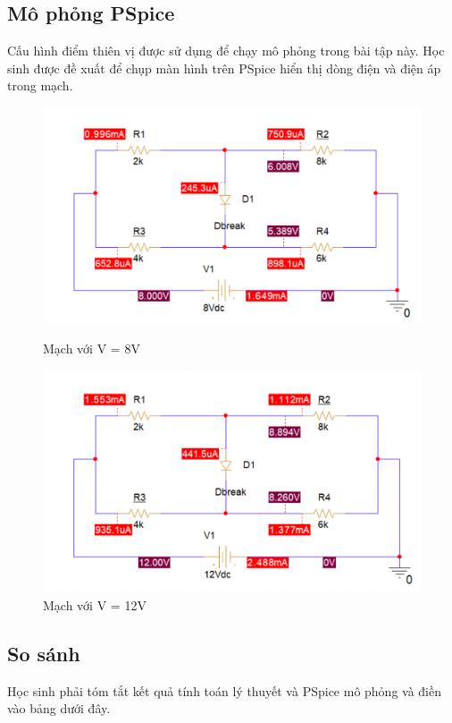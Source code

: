 \subsection{Mô phỏng PSpice}
Cấu hình điểm thiên vị được sử dụng để chạy mô phỏng trong bài tập này. Học sinh được đề xuất
để chụp màn hình trên PSpice hiển thị dòng điện và điện áp trong mạch.
\begin{figure}[h]
    \centering
    \includegraphics[scale=0.27]{graphics/ex3/f2.png}
    \caption{Mạch với V = 8V}
    \includegraphics[scale=0.27]{graphics/ex3/f4.png}
    \caption{Mạch với V = 12V}
\end{figure}
\pagebreak

\subsection{So sánh}
Học sinh phải tóm tắt kết quả tính toán lý thuyết và PSpice
mô phỏng và điền vào bảng dưới đây.

